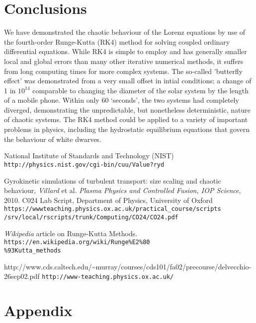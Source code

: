 \documentclass[a4paper,11pt]{article}
\begin{document}
\section{Conclusions}
We have demonstrated the chaotic behaviour of the Lorenz equations by use of the fourth-order Runge-Kutta (RK4) method for solving coupled ordinary differential equations. While RK4 is simple to employ and has generally smaller local and global errors than many other iterative numerical methods, it suffers from long computing times for more complex systems. The so-called 'butterfly effect' was demonstrated from a very small offset in intial conditions; a change of 1 in $10^{14}$ comparable to changing the diameter of the solar system by the length of a mobile phone. Within only 60 `seconds', the two systems had completely diverged, demonstrating the unpredictable, but nonetheless deterministic, nature of chaotic systems. The RK4 method could be applied to a variety of important problems in physics, including the hydrostatic equilibrium equations that govern the behaviour of white dwarves. 
\newpage
\begin{thebibliography}{9}


National Institute of Standards and Technology (NIST)\\
\texttt{http://physics.nist.gov/cgi-bin/cuu/Value?ryd}

Gyrokinetic simulations of turbulent transport: size scaling and chaotic behaviour, \textit{Villard} et al. \textit{Plasma Physics and Controlled Fusion, IOP Science}, 2010.
C024 Lab Script, Department of Physics, University of Oxford
\texttt{https://www\-{}teaching.physics.ox.ac.uk/practical\_{}course/scripts\\
/srv/local/rscripts/trunk/Computing/CO24/CO24.pdf}

\textit{Wikipedia} article on Runge-Kutta Methods.
\texttt{https://en.wikipedia.org/wiki/Runge\%{}E2\%{}80\\
\%{}93Kutta\_{}methods} 

http://www.cds.caltech.edu/\~{}murray/courses/cds101/fa02/precourse/delvecchio-26sep02.pdf
\texttt{http://www-teaching.physics.ox.ac.uk/}
\end{thebibliography}
\section{Appendix}
\end{document}
